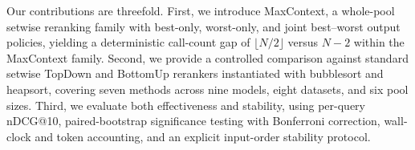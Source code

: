 Our contributions are threefold. First, we introduce MaxContext, a
whole-pool setwise reranking family with best-only, worst-only, and joint
best--worst output policies, yielding a deterministic call-count gap of
$\lfloor N/2 \rfloor$ versus $N{-}2$ within the MaxContext family.
Second, we provide a controlled comparison against standard setwise
TopDown and BottomUp rerankers instantiated with bubblesort and heapsort,
covering seven methods across nine models, eight datasets, and six pool
sizes. Third, we evaluate both effectiveness and stability, using
per-query nDCG@10, paired-bootstrap significance testing with Bonferroni
correction, wall-clock and token accounting, and an explicit input-order
stability protocol.